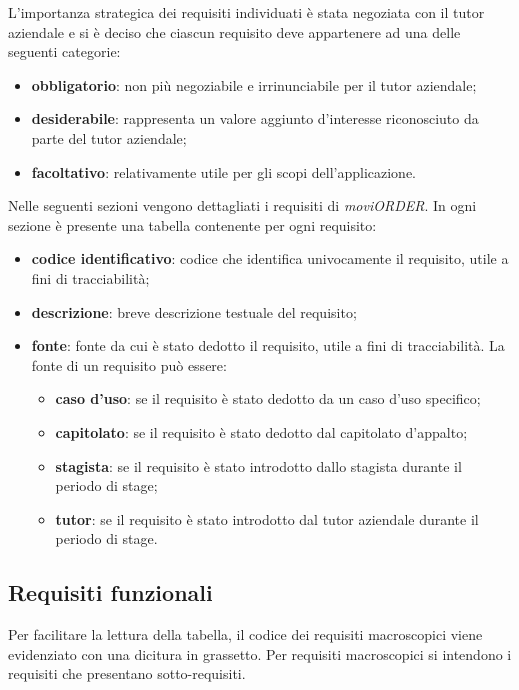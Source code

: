 L'importanza strategica dei requisiti individuati è stata negoziata con il tutor aziendale e si è deciso che ciascun requisito deve appartenere ad una delle seguenti categorie:
\begin{itemize}
	\item \textbf{obbligatorio}: non più negoziabile e irrinunciabile per il tutor aziendale;
	\item \textbf{desiderabile}: rappresenta un valore aggiunto d'interesse riconosciuto da parte del tutor aziendale;
	\item \textbf{facoltativo}: relativamente utile per gli scopi dell'applicazione.
\end{itemize}

Nelle seguenti sezioni vengono dettagliati i requisiti di \textit{moviORDER}. In ogni sezione è presente una tabella contenente per ogni requisito:
\begin{itemize}
	\item \textbf{codice identificativo}: codice che identifica univocamente il requisito, utile a fini di tracciabilità;
	\item \textbf{descrizione}: breve descrizione testuale del requisito;
	\item \textbf{fonte}: fonte da cui è stato dedotto il requisito, utile a fini di tracciabilità. La fonte di un requisito può essere:
		\begin{itemize}
			\item \textbf{caso d'uso}: se il requisito è stato dedotto da un caso d'uso specifico;
			\item \textbf{capitolato}: se il requisito è stato dedotto dal capitolato d'appalto;
			\item \textbf{stagista}: se il requisito è stato introdotto dallo stagista durante il periodo di stage;
			\item \textbf{tutor}: se il requisito è stato introdotto dal tutor aziendale durante il periodo di stage.
		\end{itemize}
\end{itemize}

\newpage

\subsection{Requisiti funzionali}

Per facilitare la lettura della tabella, il codice dei requisiti macroscopici viene evidenziato con una dicitura in grassetto. Per requisiti macroscopici si intendono i requisiti che presentano sotto-requisiti.

